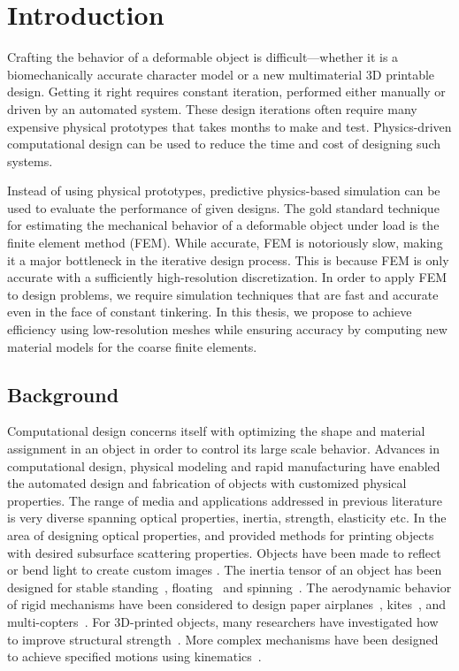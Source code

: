 \chapter{Introduction}
Crafting the behavior of a deformable object is difficult---whether
it is a biomechanically accurate character model or a new multimaterial
3D printable design.
Getting it right requires constant iteration,
performed either manually or driven by an automated system.
These design iterations often require many expensive physical prototypes
that takes months to make and test.
Physics-driven computational design can be used to reduce the time and cost of designing such systems.

Instead of using physical prototypes, predictive physics-based simulation can be used to evaluate the performance of given designs.
The gold standard technique for estimating the mechanical behavior
of a deformable object under load is the finite element method
(FEM).
While accurate, FEM is notoriously slow, making it a major
bottleneck in the iterative design process.
This is because FEM is only accurate with a sufficiently high-resolution discretization.
In order to apply FEM to design problems, we require simulation techniques that are fast and accurate even in the face of constant tinkering.
In this thesis, we propose to achieve efficiency using low-resolution meshes while ensuring accuracy by computing new material models for the coarse finite elements.
\section{Background}
Computational design concerns itself with optimizing the shape and material assignment in an object in order to control its large scale behavior.
Advances in computational design, physical modeling and rapid manufacturing 
have enabled the automated design and fabrication of objects with customized physical properties.
The range of media and applications addressed in previous literature is very diverse spanning optical properties, inertia, strength, elasticity etc.
In the area of designing optical properties, \citet{Hasan:2010:PRO} and
\citet{Dong:2010:FSS} provided methods for printing objects with desired subsurface scattering properties. Objects have been made to reflect or bend light to create custom images \citep{papas11goal,Weyrich:2009,kiser2013}.
The inertia tensor of an object has been designed for stable standing~\citep{Prevost:2013kb}, floating~\citep{musialski-2015}
and spinning~\citep{Bacher:2014}.
The aerodynamic behavior of rigid mechanisms have been considered to design  paper airplanes~\citep{Umetani:2014}, kites~\citep{Martin:2015}, and multi-copters~\citep{Du:2016}.
For 3D-printed objects, many researchers have investigated how to improve structural strength~\citep{Stava:2012,Zhou:2013,Langlois:2016,Wu:2016,Ulu:2017}.
More complex mechanisms have been designed to achieve specified motions using kinematics~\citep{Zhu:2012,Coros:2013:CDM,Bacher:2015,Megaro:2017}.

